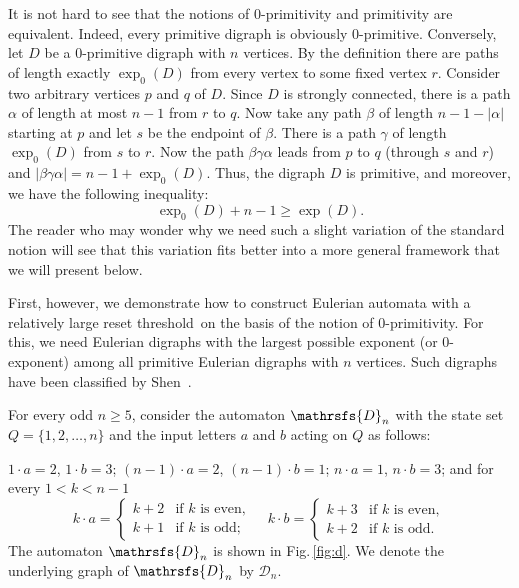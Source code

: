 \documentclass[11pt]{llncs}
\newcommand{\reth}{reset threshold}
\begin{document}
It is not hard to see that the notions of 0-primitivity and primitivity are
equivalent. Indeed, every primitive digraph is obviously 0-primitive.
Conversely, let $D$ be a 0-primitive digraph with $n$ vertices. By the
definition there are paths of length exactly $\exp_0(D)$ from every vertex to
some fixed vertex $r$. Consider two arbitrary vertices $p$ and $q$ of $D$.
Since $D$ is strongly connected, there is a path $\alpha$ of length at most $n
- 1$ from $r$ to $q$. Now take any path $\beta$ of length $n - 1 - |\alpha|$
starting at $p$ and let $s$ be the endpoint of $\beta$. There is a path
$\gamma$ of length $\exp_0(D)$ from $s$ to $r$. Now the path
$\beta\gamma\alpha$ leads from $p$ to $q$ (through $s$ and $r$) and
$|\beta\gamma\alpha|=n - 1 + \exp_0(D)$. Thus, the digraph $D$ is primitive,
and moreover, we have the following inequality:
\begin{equation}
\label{second inequality} \exp_0(D) + n - 1 \geq \exp(D).
\end{equation}
The reader who may wonder why we need such a slight variation of the standard
notion will see that this variation fits better into a more general framework
that we will present below.

First, however, we demonstrate how to construct Eulerian automata with a
relatively large \reth\ on the basis of the notion of 0-primitivity. For this,
we need Eulerian digraphs with the largest possible exponent (or 0-exponent)
among all primitive Eulerian digraphs with $n$ vertices. Such digraphs have
been classified by Shen~\cite{Shen00}.

For every odd $n \geq 5$, consider the automaton $\mathrsfs{D}_n$ with the
state set $Q=\{1,2,\dots,n\}$ and the input letters $a$ and $b$ acting on $Q$
as follows:

$ 1 \cdot a = 2$, $1 \cdot b = 3$; $(n - 1) \cdot a = 2$, $(n - 1) \cdot b =
1$; $n \cdot a = 1$, $n \cdot b = 3$; and for every $1 < k < n - 1$
$$k \cdot a=\begin{cases}
k + 2 &\text{if } k \text{ is even},\\
k + 1 &\text{if } k \text{ is odd};
\end{cases}\quad
k \cdot b=\begin{cases}
k + 3 &\text{if } k \text{ is even},\\
k + 2 &\text{if } k \text{ is odd}.
\end{cases}$$
The automaton $\mathrsfs{D}_n$ is shown in Fig.\,\ref{fig:d}. We denote the
underlying graph of $\mathrsfs{D}_n$ by $\mathcal{D}_n$.
\end{document}
